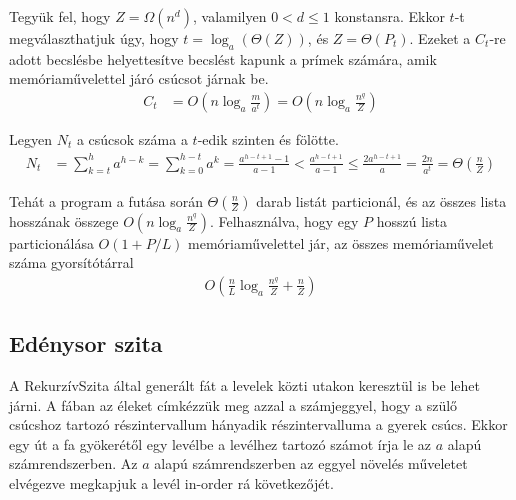 \documentclass[12pt]{report}
\begin{document}
Tegyük fel, hogy $Z = \Omega\left( n^d \right)$, valamilyen $0 < d \le 1$ konstansra.
Ekkor $t$-t megválaszthatjuk úgy, hogy $t = \log_{a}\left(\Theta(Z)\right)$,
és $Z = \Theta(P_t)$.
Ezeket a $C_t$-re adott becslésbe helyettesítve becslést kapunk
a prímek számára,
amik memóriaművelettel járó csúcsot járnak be.
\begin{align*}
C_t
&= O\left( n \log_{a}{\frac{m}{a^t}} \right)
= O\left( n \log_{a}{\frac{n^q}{Z}} \right)
\end{align*}

Legyen $N_t$ a csúcsok száma a $t$-edik szinten és fölötte.
\begin{align*}
N_t
&= \sum_{k=t}^h a^{h-k}
= \sum_{k=0}^{h-t} a^k
= \frac{a^{h-t+1}-1}{a-1}
< \frac{a^{h-t+1}}{a-1}
\le \frac{2a^{h-t+1}}{a}
= \frac{2n}{a^t}
= \Theta\left( \frac{n}{Z} \right)
\end{align*}

Tehát a program a futása során $\Theta\left( \frac{n}{Z} \right)$ darab listát
particionál, és az összes lista hosszának összege
$O\left( n \log_{a}{\frac{n^q}{Z}} \right)$.
Felhasználva, hogy egy $P$ hosszú lista particionálása
$O(1+P/L)$ memóriaművelettel jár,
az összes memóriaművelet száma gyorsítótárral
\begin{align*}
O\left( \frac{n}{L} \log_{a}{\frac{n^q}{Z}} + \frac{n}{Z} \right)
\end{align*}

\subsection{Edénysor szita}

A RekurzívSzita által generált fát
a levelek közti utakon keresztül is be lehet járni.
A fában az éleket címkézzük meg azzal a számjeggyel,
hogy a szülő csúcshoz tartozó részintervallum
hányadik részintervalluma a gyerek csúcs.
Ekkor egy út a fa gyökerétől egy levélbe a levélhez tartozó
számot írja le az $a$ alapú számrendszerben.
Az $a$ alapú számrendszerben az eggyel növelés műveletet elvégezve
megkapjuk a levél in-order rá következőjét.
\end{document}
